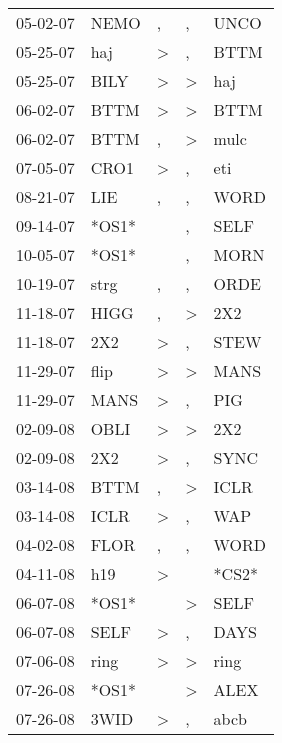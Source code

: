 \begin{supertabular}{lllll}
 05-02-07 &   NEMO &             , &                , &   UNCO \\
 05-25-07 &    haj &  \textgreater &                , &   BTTM \\
 05-25-07 &   BILY &  \textgreater &     \textgreater &    haj \\
 06-02-07 &   BTTM &  \textgreater &     \textgreater &   BTTM \\
 06-02-07 &   BTTM &             , &     \textgreater &   mulc \\
 07-05-07 &   CRO1 &  \textgreater &                , &    eti \\
 08-21-07 &    LIE &             , &                , &   WORD \\
 09-14-07 &  *OS1* &               &                , &   SELF \\
 10-05-07 &  *OS1* &               &                , &   MORN \\
 10-19-07 &   strg &             , &                , &   ORDE \\
 11-18-07 &   HIGG &             , &     \textgreater &    2X2 \\
 11-18-07 &    2X2 &  \textgreater &                , &   STEW \\
 11-29-07 &   flip &  \textgreater &     \textgreater &   MANS \\
 11-29-07 &   MANS &  \textgreater &                , &    PIG \\
 02-09-08 &   OBLI &  \textgreater &     \textgreater &    2X2 \\
 02-09-08 &    2X2 &  \textgreater &                , &   SYNC \\
 03-14-08 &   BTTM &             , &     \textgreater &   ICLR \\
 03-14-08 &   ICLR &  \textgreater &                , &    WAP \\
 04-02-08 &   FLOR &             , &                , &   WORD \\
 04-11-08 &    h19 &  \textgreater &                  &  *CS2* \\
 06-07-08 &  *OS1* &               &     \textgreater &   SELF \\
 06-07-08 &   SELF &  \textgreater &                , &   DAYS \\
 07-06-08 &   ring &  \textgreater &     \textgreater &   ring \\
 07-26-08 &  *OS1* &               &     \textgreater &   ALEX \\
 07-26-08 &   3WID &  \textgreater &                , &   abcb \\

\end{supertabular}
